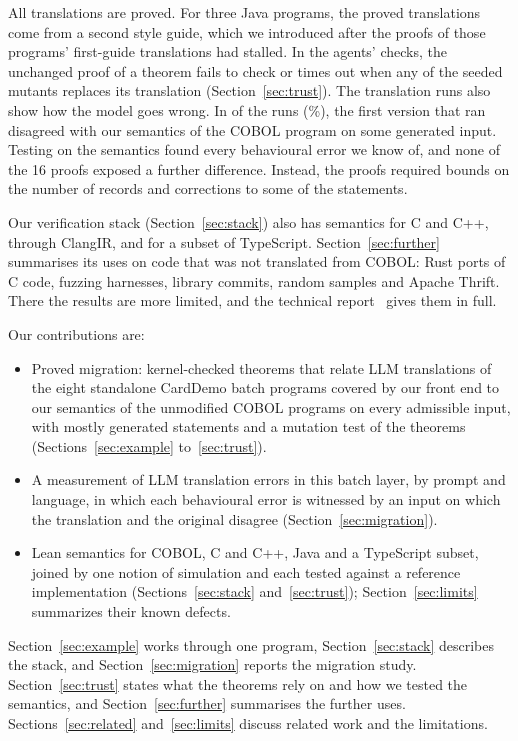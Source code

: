 All \aTheorems{} translations are proved. For three Java programs, the proved translations come from a second style
guide, which we introduced after the proofs of those programs' first-guide translations had stalled. In the agents' checks, the unchanged proof of a theorem fails to check or times out when any of the \aMutants{} seeded
mutants replaces its translation (Section~\ref{sec:trust}). The translation runs also show how the model
goes wrong. In \aaFirstDiff{} of the \aaRuns{} runs (\aaFirstDiffPct\%), the first version that ran disagreed with our
semantics of the COBOL program on some generated input. Testing on the semantics found every behavioural error we know
of, and none of the 16 proofs exposed a further difference. Instead, the proofs required bounds on the number of records and
corrections to some of the statements.

Our verification stack (Section~\ref{sec:stack}) also has semantics for C and C++, through ClangIR, and for a subset of
TypeScript. Section~\ref{sec:further} summarises its uses on code that was not translated from COBOL: Rust ports of C
code, fuzzing harnesses, library commits, random samples and Apache Thrift. There the results are more limited, and
the technical report~\cite{fvtechreport} gives them in full.

Our contributions are:
\begin{itemize}
\item Proved migration: \aTheorems{} kernel-checked theorems that relate LLM translations of the eight standalone
CardDemo batch programs covered by our front end to our semantics of the unmodified COBOL programs on every admissible
input, with mostly generated statements and a mutation test of the theorems (Sections~\ref{sec:example}
to~\ref{sec:trust}).
\item A measurement of LLM translation errors in this batch layer, by prompt and language, in which each behavioural
error is witnessed by an input on which the translation and the original disagree (Section~\ref{sec:migration}).
\item Lean semantics for COBOL, C and C++, Java and a TypeScript subset, joined by one notion of simulation and each tested against a reference implementation (Sections~\ref{sec:stack} and~\ref{sec:trust}); Section~\ref{sec:limits} summarizes their known defects.
\end{itemize}
Section~\ref{sec:example} works through one program, Section~\ref{sec:stack} describes the stack, and
Section~\ref{sec:migration} reports the migration study. Section~\ref{sec:trust} states what the theorems rely on and
how we tested the semantics, and Section~\ref{sec:further} summarises the further uses. Sections~\ref{sec:related}
and~\ref{sec:limits} discuss related work and the limitations.
